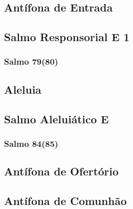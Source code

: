 \subsection{Antífona de Entrada}\label{subsection:tempus-adventus/missa-1/introitus}

\subsection[Salmo Responsorial]{Salmo Responsorial \textmd{E 1}}\label{subsection:tempus-adventus/missa-1/psalmus-responsorius}
\subsubsection{Salmo 79(80)}

\AllowPageFlush

\subsection{Aleluia}\label{subsection:tempus-adventus/missa-1/alleluia}

\AllowPageFlush

\subsection[Salmo Aleluiático]{Salmo Aleluiático \textmd{E \protect\GreStar}}\label{subsection:tempus-adventus/missa-1/psalmus-alleluiaticus}
\subsubsection{Salmo 84(85)}

\AllowPageFlush

\subsection{Antífona de Ofertório}\label{subsection:tempus-adventus/missa-1/offertorium}

\AllowPageFlush

\subsection{Antífona de Comunhão}\label{subsection:tempus-adventus/missa-1/communio}

\AllowPageFlush
